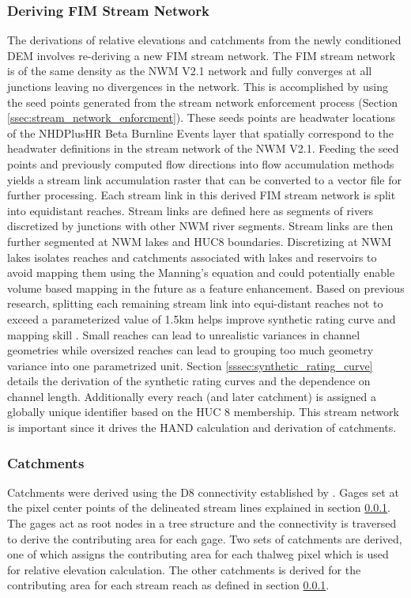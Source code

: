 \subsubsection{Deriving FIM Stream Network}
\label{sssec:deriving_fim_stream_network}
%
The derivations of relative elevations and catchments from the newly conditioned DEM involves re-deriving a new FIM stream network. 
The FIM stream network is of the same density as the NWM V2.1 network and fully converges at all junctions leaving no divergences in the network.
This is accomplished by using the seed points generated from the stream network enforcement process (Section \ref{ssec:stream_network_enforcment}).
These seeds points are headwater locations of the NHDPlusHR Beta Burnline Events layer that spatially correspond to the headwater definitions in the stream network of the NWM V2.1.
Feeding the seed points and previously computed flow directions into flow accumulation methods \cite{wallis2009parallel,tarboton1997new,tarboton2005terrain} yields a stream link accumulation raster that can be converted to a vector file for further processing.
Each stream link in this derived FIM stream network is split into equidistant reaches.
Stream links are defined here as segments of rivers discretized by junctions with other NWM river segments.
Stream links are then further segmented at NWM lakes and HUC8 boundaries.
Discretizing at NWM lakes isolates reaches and catchments associated with lakes and reservoirs to avoid mapping them using the Manning's equation and could potentially enable volume based mapping in the future as a feature enhancement.
Based on previous research, splitting each remaining stream link into equi-distant reaches not to exceed a parameterized value of 1.5km helps improve synthetic rating curve and mapping skill \cite{garousi2019terrain,godbout2019error,zheng2018geoflood}.
Small reaches can lead to unrealistic variances in channel geometries while oversized reaches can lead to grouping too much geometry variance into one parametrized unit.
Section \ref{sssec:synthetic_rating_curve} details the derivation of the synthetic rating curves and the dependence on channel length. 
Additionally every reach (and later catchment) is assigned a globally unique identifier based on the HUC 8 membership.
This stream network is important since it drives the HAND calculation and derivation of catchments.
%
\subsubsection{Catchments}
%
Catchments were derived using the D8 connectivity established by .
Gages set at the pixel center points of the delineated stream lines explained in section \ref{sssec:deriving_fim_stream_network}.
The gages act as root nodes in a tree structure and the connectivity is traversed to derive the contributing area for each gage.
Two sets of catchments are derived, one of which assigns the contributing area for each thalweg pixel which is used for relative elevation calculation.
The other catchments is derived for the contributing area for each stream reach as defined in section \ref{sssec:deriving_fim_stream_network}. 
%

